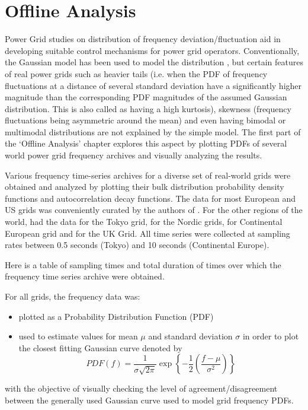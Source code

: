 \section[Offline/Postmortem Analysis]{Offline Analysis}
\label{sec:offline}

Power Grid studies on distribution of frequency deviation/fluctuation aid in developing suitable control mechanisms for power grid operators. Conventionally, the Gaussian model has been used to model the distribution \cite{woodAndWollenbergPowerGenerationOperationAndControl}, but certain features of real power grids such as heavier tails (i.e. when the PDF of frequency fluctuations at a distance of several standard deviation have a significantly higher magnitude than the corresponding PDF magnitudes of the assumed Gaussian distribution. This is also called as having a high kurtosis), skewness (frequency fluctuations being asymmetric around the mean) and even having bimodal or multimodal distributions are not explained by the simple model. The first part of the `Offline Analysis' chapter explores this aspect by plotting PDFs of several world power grid frequency archives and visually analyzing the results.
 
Various frequency time-series archives for a diverse set of real-world grids were obtained and analyzed by plotting their bulk distribution probability density functions and autocorrelation decay functions. The data for most European and US grids was conveniently curated by the authors of \cite{lrydin01, lrydinGithub}. For the other regions of the world, \cite{tokyo2017, tokyo2020} had the data for the Tokyo grid, \cite{nordic2018, nordic2019} for the Nordic grids, \cite{ce2019, ce2020} for Continental European grid and \cite{ukNationalGridESOData} for the UK Grid.
All time series were collected at sampling rates between 0.5 seconds (Tokyo) and 10 seconds (Continental Europe).

Here is a table of sampling times and total duration of times over which the frequency time series archive were obtained.

\renewcommand{\arraystretch}{1.0}




For all grids, the frequency data was:
\begin{itemize}
	\item plotted as a Probability Distribution Function (PDF)
	\item used to estimate values for mean $\mu$ and standard deviation $\sigma$ in order to plot the closest fitting Gaussian curve denoted by
	\begin{equation}
		PDF(f) = \frac{1}{\sigma \sqrt{2\pi}}\exp{\left\{-\frac{1}{2}\left(\frac{f-\mu}{\sigma^2}\right)\right\}}
	\end{equation}
\end{itemize}
with the objective of visually checking the level of agreement/disagreement between the generally used Gaussian curve used to model grid frequency PDFs.

